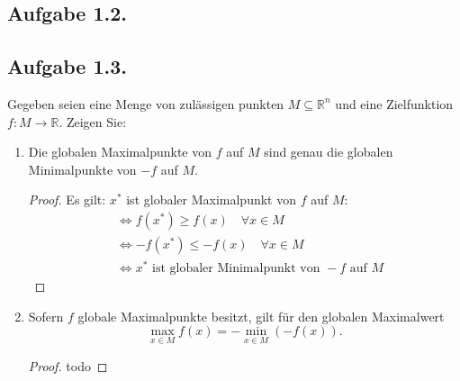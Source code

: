 \documentclass[12pt]{extreport} %
\newcommand{\R}{\mathbb{R}}
\theoremstyle{named}
\theoremstyle{nnamed}
\theoremstyle{itshape}
\theoremstyle{normal}
\begin{document}
\subsection*{Aufgabe 1.2.}

\begin{figure*}[h!] \centering
\end{figure*}

\begin{figure*}[h!] \centering
\end{figure*}

\begin{figure*}[h!] \centering
\end{figure*}

\subsection*{Aufgabe 1.3.}

Gegeben seien eine Menge von zulässigen punkten $M \subseteq \R^n$ und eine Zielfunktion $f \colon M \rightarrow \R$. Zeigen Sie: 

\begin{enumerate}
	\item Die globalen Maximalpunkte von $f$ auf $M$ sind genau die globalen Minimalpunkte von $-f$ auf $M$.
		\begin{proof}
			Es gilt: $x^*$ ist globaler Maximalpunkt von $f$ auf $M$:
			\begin{align*}
				& \iff f(x^*) \geq f(x) \quad \forall x \in M \\ 
				& \iff - f(x^*) \leq -f(x) \quad \forall x \in M \\
				& \iff x^* \text{ ist globaler Minimalpunkt von } -f \text{ auf } M
			\end{align*}
		\end{proof}
	\item Sofern $f$ globale Maximalpunkte besitzt, gilt für den globalen Maximalwert
	$$ \max_{x \in M} f(x) = - \min_{x \in M} \left( - f(x) \right). $$
		\begin{proof}
		todo
		\end{proof}
\end{enumerate}
\end{document}
